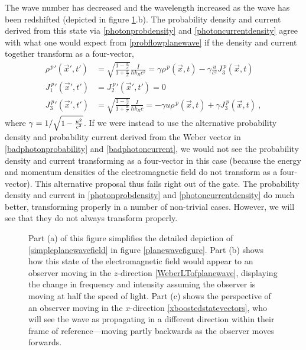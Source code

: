 \documentclass[12pt,secnumarabic,amsmath,amssymb,balancelastpage,nofootinbib]{article}
\begin{document}
The wave number has decreased and the wavelength increased as the wave has been redshifted (depicted in figure \ref{singlewavetransformations}.b).  The probability density and current derived from this state via \eqref{photonprobdensity} and \eqref{photoncurrentdensity} agree with what one would expect from \eqref{probflowplanewave} if the density and current together transform as a four-vector,
\begin{align}
\rho^{\,p}{}'(\vec{x}',t')&=\sqrt{\frac{1-\frac{u}{c}}{1+\frac{u}{c}}}\frac{I}{\hbar k_R c^2}=\gamma \rho^{\,p}(\vec{x},t)-\gamma \frac{u}{c^2} J_3^{\:p}(\vec{x},t)
\nonumber
\\
J_1^{\:p}{}'(\vec{x}',t')&=J_2^{\:p}{}'(\vec{x}',t')=0
\nonumber
\\
J_3^{\:p}{}'(\vec{x}',t')&=\sqrt{\frac{1-\frac{u}{c}}{1+\frac{u}{c}}}\frac{I}{\hbar k_R c}= - \gamma u \rho^{\,p}(\vec{x},t)+\gamma J_3^{\:p}(\vec{x},t)
\ ,
\label{zboostedprobflow}
\end{align}
where $\gamma=1/\text{\footnotesize $\sqrt{1-\frac{u^2}{c^2}}$}$.  If we were instead to use the alternative probability density and probability current derived from the Weber vector in \eqref{badphotonprobability} and \eqref{badphotoncurrent}, we would not see the probability density and current transforming as a four-vector in this case (because the energy and momentum densities of the electromagnetic field do not transform as a four-vector).  This alternative proposal thus fails right out of the gate.  The probability density and current in \eqref{photonprobdensity} and \eqref{photoncurrentdensity} do much better, transforming properly in a number of non-trivial cases.  However, we will see that they do not always transform properly.


\begin{figure}[h!]
\caption{Part (a) of this figure simplifies the detailed depiction of \eqref{simpleplanewavefield} in figure \ref{planewavefigure}.  Part (b) shows how this state of the electromagnetic field would appear to an observer moving in the $z$-direction \eqref{WeberLTofplanewave}, displaying the change in frequency and intensity assuming the observer is moving at half the speed of light.  Part (c) shows the perspective of an observer moving in the $x$-direction \eqref{xboostedstatevectors}, who will see the wave as propagating in a different direction within their frame of reference---moving partly backwards as the observer moves forwards.}
\label{singlewavetransformations}
\end{figure}
\end{document}
